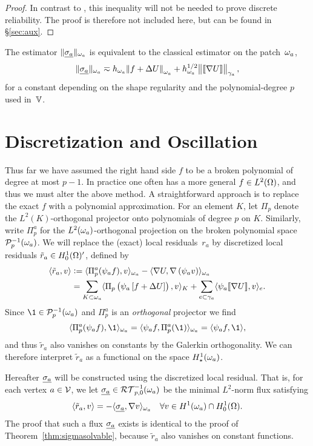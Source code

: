 \documentclass[thesis.tex]{subfiles}
\begin{document}
  \begin{proof}
    In contrast to \cite{cascon2012}, this inequality will not be needed to prove discrete reliability.
    The proof is therefore not included here, but can be found in \S\ref{sec:aux}.
  \end{proof}
\begin{cor}
  \label{lem:starequiv}
  The estimator $\| \underline{\sigma_a} \|_{\omega_a}$ is equivalent to the classical estimator on the patch~$\omega_a$, 
  \[
    \| \underline{\sigma_a} \|_{\omega_a} \eqsim h_{\omega_a}\norm{f + \Delta U}_{\omega_a} + h^{1/2}_{\omega_a} \norm{\llbracket \nabla U  \rrbracket}_{\gamma_a},
  \]
  for a constant depending on the shape regularity and the polynomial-degree $p$ used in~$\mathbb{V}$.
\end{cor}
\section{Discretization and Oscillation}
\label{sec:oscillation}
Thus far we have assumed the right hand side $f$ to be a broken polynomial of degree at most $p-1$. In practice one 
often has a more general $f \in L^2(\Omega)$, and thus we must alter the above method.
A straightforward approach is to replace the exact $f$ with a polynomial approximation. 
For an element $K$, let  $\Pi_p$ denote the $L^2(K)$-orthogonal projector onto polynomials of degree $p$ on $K$.
Similarly, write $\Pi_p^a$ for the $L^2(\omega_a)$-orthogonal projection on the broken polynomial space $\mathcal{P}_p^{-1}(\omega_a)$.
We will replace the (exact) local residuals~$r_a$ by discretized local residuals  $\tilde r_a  \in H_0^1(\Omega)'$,  defined by 
\begin{align*}
  \langle \tilde r_a, v \rangle &:= \langle \Pi_p^a(\psi_af),v \rangle_{\omega_a} - \langle \nabla U, \nabla \left(\psi_a v\right) \rangle_{\omega_a} \\
   &= \sum_{K \subset \omega_a} \langle \Pi_p \left(\psi_a \left[f + \Delta U\right]\right), v \rangle_K 
  +\sum_{e \subset \gamma_a} \langle \psi_a \llbracket \nabla U\rrbracket, v \rangle_e.
\end{align*}
Since $\1 \in \P_p^{-1}(\w_a)$ and $\Pi_p^a$ is an \emph{orthogonal} projector we find 
\[
  \ip{\Pi_p^a(\psi_a f), \1}_{\w_a} = \ip{\psi_a f, \Pi_p^a(\1)}_{\w_a} = \ip{\psi_a f, \1},
\]
and thus $\tilde r_a$ also vanishes on constants by the Galerkin orthogonality. We can therefore interpret
$\tilde r_a$ as a functional on the space  $H_\star^1(\omega_a)$.

Hereafter $\underline{\sigma_a}$ will be constructed using the discretized local residual. That is, 
for each vertex $a \in \mathcal{V}$, we let  $\underline{\sigma_a}\in\mathcal{RT}_{p,0}^{-1}(\omega_a)$ be the minimal $L^2$-norm
flux satisfying
\begin{equation}
  \label{eq:sigmadefdisc}
  \langle \tilde r_a, v \rangle = - \langle \underline{\sigma_a}, \nabla v \rangle_{\omega_a} \quad \forall v \in H^1(\omega_a) \cap H_0^1(\Omega).
\end{equation}
The proof that such a flux $\underline{\sigma_a}$ exists is identical to the proof
of Theorem~\ref{thm:sigmasolvable}, because $\tilde r_a$ also vanishes on constant functions.
\end{document}
